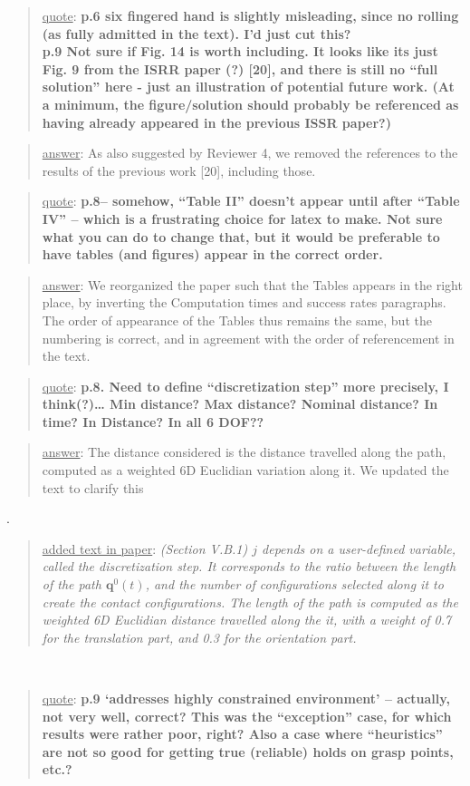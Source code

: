 \documentclass[a4paper]{article}
\newcommand{\done}[0]{}
\newcommand\quot[1]{\begin{quote} \underline{quote}: \textbf{#1}\end{quote}}
\newcommand\as[1]{\begin{quote} \underline{answer}: {#1}\end{quote} }
\newcommand\qt[1]{\begin{quote} \underline{added text in paper}: \textit{#1}\end{quote} \leavevmode \\ }
\begin{document}
\quot{
p.6 six fingered hand is slightly misleading, since no rolling (as fully admitted in the text). I'd just cut this? \\
p.9 Not sure if Fig. 14 is worth including. It looks like its just Fig. 9 from the ISRR paper (?) [20], and there is still no ``full solution'' here -
 just an illustration of potential future work. 
 (At a minimum, the figure/solution should probably be referenced as having already appeared in the previous ISSR paper?)
}

\as{As also suggested by Reviewer 4, we removed the references to the results of the previous work [20], including those.}\done

\quot{
p.8– somehow, “Table II” doesn’t appear until after “Table IV” – which is a frustrating choice for latex to make. Not sure what you can do to change that, but it would be preferable to have tables (and figures) appear in the correct order.
}

\as{We reorganized the paper such that the Tables appears in the right place, by inverting the Computation times and success rates paragraphs. The order of appearance of the Tables thus remains
the same, but the numbering is correct, and in agreement with the order of referencement in the text.}\done

\quot{
p.8. Need to define ``discretization step'' more precisely, I think(?)… Min distance? Max distance? Nominal distance? In time? In Distance? In all 6 DOF??
}

\as{The distance considered is the distance travelled along the path, computed as a weighted 6D Euclidian variation along it. We updated the text to clarify this}.
\qt{(Section V.B.1) $j$ depends on a user-defined variable, called the discretization step. It corresponds to the ratio between the length of the path $\mathbf{q}^0(t)$, and the number
of configurations selected along it to create the contact configurations. The length of the path is computed as the weighted 6D Euclidian distance
travelled along the it, with a weight of 0.7 for the translation part, and 0.3
for the orientation part.}

\quot{
p.9 ‘addresses highly constrained environment’ – actually, not very well, correct? This was the “exception” case, for which results were rather poor, right? Also a case where “heuristics” are not so good for getting true (reliable) holds on grasp points, etc.?
}
\end{document}
